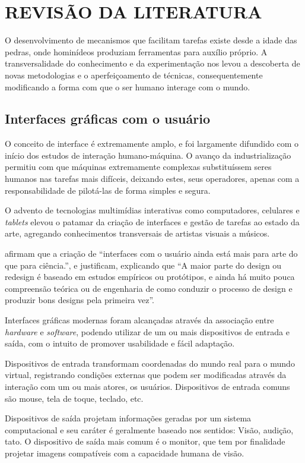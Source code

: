 \chapter{REVISÃO DA LITERATURA}

O desenvolvimento de mecanismos que facilitam tarefas existe desde a idade das
pedras, onde hominídeos produziam ferramentas para auxílio próprio. A
transversalidade do conhecimento e da experimentação nos levou a descoberta de
novas metodologias e o aperfeiçoamento de técnicas, consequentemente modificando
a forma com que o ser humano interage com o mundo.

\section{Interfaces gráficas com o usuário}

O conceito de interface é extremamente amplo, e foi largamente difundido com o
início dos estudos de interação humano-máquina. O avanço da industrialização
permitiu com que máquinas extremamente complexas substituíssem seres humanos nas
tarefas mais difíceis, deixando estes, seus operadores, apenas com a
responsabilidade de pilotá-las de forma simples e segura.

O advento de tecnologias multimídias interativas como computadores, celulares e
\textit{tablets} elevou o patamar da criação de interfaces e gestão de tarefas
ao estado da arte, agregando conhecimentos transversais de artistas visuais a
músicos.

 afirmam que a criação de ``interfaces
com o usuário ainda está mais para arte do que para ciência.'', e justificam,
explicando que ``A maior parte do design ou redesign é baseado em estudos
empíricos ou protótipos, e ainda há muito pouca compreensão teórica ou de
engenharia de como conduzir o processo de design e produzir bons designs pela
primeira vez''.

Interfaces gráficas modernas foram alcançadas através da associação entre
\textit{hardware} e \textit{software}, podendo utilizar de um ou mais
dispositivos de entrada e saída, com o intuito de promover usabilidade e fácil
adaptação.

Dispositivos de entrada transformam coordenadas do mundo real para o mundo
virtual, registrando condições externas que podem ser modificadas através da
interação com um ou mais atores, os usuários. Dispositivos de entrada comuns são
mouse, tela de toque, teclado, etc.

Dispositivos de saída projetam informações geradas por um sistema computacional
e seu caráter é geralmente baseado nos sentidos: Visão, audição, tato. O
dispositivo de saída mais comum é o monitor, que tem por finalidade projetar
imagens compatíveis com a capacidade humana de visão.

